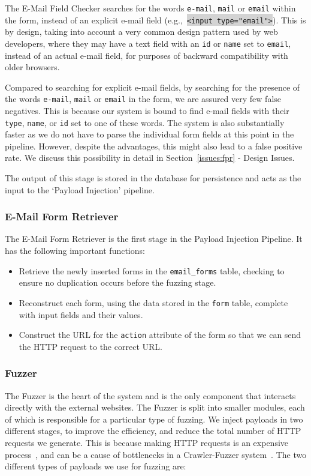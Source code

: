 The E-Mail Field Checker searches for the words \texttt{e-mail}, \texttt{mail} or \texttt{email} within the form, instead of an explicit e-mail field (e.g.,\ \colorbox{lightgray}{\lstinline{<input type="email">}}). This is by design, taking into account a very common design pattern used by web developers, where they may have a text field with an \texttt{id} or \texttt{name} set to \texttt{email}, instead of an actual e-mail field, for purposes of backward compatibility with older browsers.

Compared to searching for explicit e-mail fields, by searching for the presence of the words \texttt{e-mail}, \texttt{mail} or \texttt{email} in the form, we are assured very few false negatives. This is because our system is bound to find e-mail fields with their \texttt{type}, \texttt{name}, or \texttt{id} set to one of these words. The system is also substantially faster as we do not have to parse the individual form fields at this point in the pipeline. However, despite the advantages, this might also lead to a false positive rate. We discuss this possibility in detail in Section~\ref*{issues:fpr} - Design Issues.

The output of this stage is stored in the database for persistence and acts as the input to the `Payload Injection' pipeline.


\subsubsection{E-Mail Form Retriever}
\label{Comp:EMFR}
The E-Mail Form Retriever is the first stage in the Payload Injection Pipeline. It has the following important functions:
\begin{itemize}
	\item Retrieve the newly inserted forms in the \texttt{email\_forms} table, checking to ensure no duplication occurs before the fuzzing stage.
	\item Reconstruct each form, using the data stored in the \texttt{form} table, complete with input fields and their values.
	\item Construct the URL for the \texttt{action} attribute of the form so that we can send the HTTP request to the correct URL. 
\end{itemize}

\subsubsection{Fuzzer}
\label{Comp:Fuzzer}
The Fuzzer is the heart of the system and is the only component that interacts directly with the external websites. The Fuzzer is split into smaller modules, each of which is responsible for a particular type of fuzzing.  We inject payloads in two different stages, to improve the efficiency, and reduce the total number of HTTP requests we generate. This is because making HTTP requests is an expensive process~\cite{McGrath2009}, and can be a cause of bottlenecks in a Crawler-Fuzzer system~\cite{ShkapenyukTorstenSuel2001}.
The two different types of payloads we use for fuzzing are:
